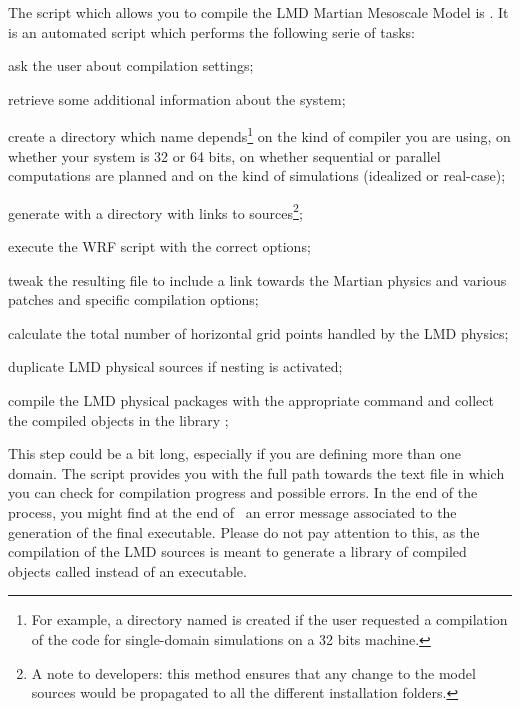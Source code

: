 \sk
The  script which allows you to compile the LMD Martian Mesoscale Model is . It is an automated script which performs the following serie of tasks:
\begin{citemize}
\item ask the user about compilation settings;
\item retrieve some additional information about the system;
\item create a directory  which name depends\footnote{For example, a  directory named  is created if the user requested a  compilation of the code for single-domain simulations on a 32 bits machine.} on the kind of compiler you are using, on whether your system is 32 or 64 bits, on whether sequential or parallel computations are planned and on the kind of simulations (idealized or real-case); 
\item generate with  a directory  with links to  sources\footnote{A note to developers: this method ensures that any change to the model sources would be propagated to all the different  installation folders.};
\item execute the WRF  script with the correct options;
\item tweak the resulting  file to include a link towards the Martian physics and various patches and specific compilation options;
\item calculate the total number of horizontal grid points handled by the LMD physics;
\item duplicate LMD physical sources if nesting is activated;
\pagebreak
\item compile the LMD physical packages with the appropriate  command
and collect the compiled objects in the library ;
\begin{finger}
\item This step could be a bit long, especially if you are defining more than one domain. The  script provides you with the full path towards the text file  in which you can check for compilation progress and possible errors. In the end of the process, you might find at the end of~ an error message associated to the generation of the final executable. Please do not pay attention to this, as the compilation of the LMD sources is meant to generate a library of compiled objects called  instead of an executable.

\end{finger}
\end{citemize}
